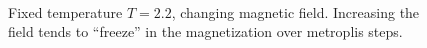\documentclass[singlepage,notitlepage,nofootinbib,11pt]{revtex4-1}
\begin{document}
\begin{figure}[h]
  \centering
  \captionsetup[subfigure]{labelformat=empty}
  \\
  \caption{\label{fields} Fixed temperature $T=2.2$, changing magnetic field. Increasing the field tends to ``freeze'' in the magnetization over metroplis steps.}
\end{figure}
\end{document}
